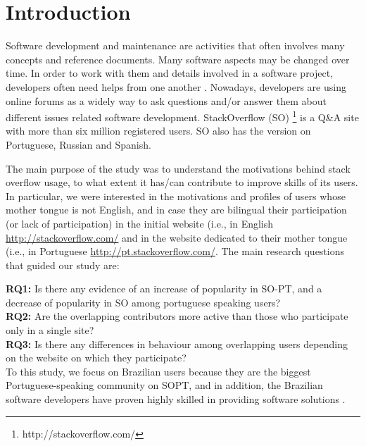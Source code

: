 \section{Introduction}
Software development and maintenance are activities that often involves many concepts and reference documents. Many software aspects may be changed over time. In order to work with them and details involved in a software project, developers often need helps from one another \cite{Wang2013}. Nowadays, developers are using online forums as a widely way to ask questions and/or answer them about different issues related software development. StackOverflow (SO) \footnote{http://stackoverflow.com/} is a Q\&A site with more than six million registered users. SO also has the version on Portuguese, Russian and Spanish. 

The main purpose of the study was to understand the motivations behind stack overflow usage, to what extent it has/can contribute to improve skills of its users. In particular, we were interested in the motivations and profiles of users whose mother tongue is not English, and in case they are bilingual their participation (or lack of participation) in the initial website (i.e., in English \url{http://stackoverflow.com/} and in the website dedicated to their mother tongue (i.e., in Portuguese \url{http://pt.stackoverflow.com/}. The main research questions that guided our study are:

\noindent\textbf{RQ1:} Is there any evidence of an increase of popularity in SO-PT, and a decrease of popularity in SO among portuguese speaking users?\\
\textbf{RQ2:} Are the overlapping contributors more active than those who participate only in a single site? \\ 
\textbf{RQ3:} Is there any differences in behaviour among overlapping users depending on the website on which they participate?\\ 

To this study, we focus on Brazilian users because they are the biggest Portuguese-speaking community on SOPT, and in addition, the Brazilian software developers have proven highly skilled in providing software solutions .   
